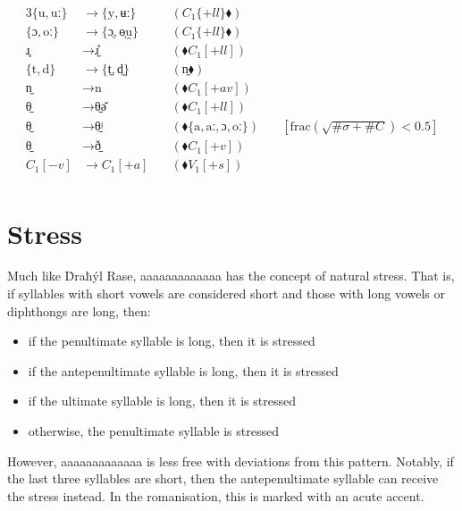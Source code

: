 \documentclass{book}
\newcommand{\lname}{aaaaaaaaaaaaa}
\begin{document}
\begin{alignat*}{3}
  \{\text{u}, \text{uː}\} &\rightarrow \{\text{y}, \text{ʉː}\} &\quad(C_1\{+ll\} \blacklozenge) \\
  \{\text{ɔ}, \text{oː}\} &\rightarrow \{\text{ɔ̜}, \text{ɵ̜u̯}\} &\quad(C_1\{+ll\} \blacklozenge) \\
  \text{ɹ̥} &\rightarrow \text{ɹ̼̊} &\quad(\blacklozenge C_1[+ll]) \\
  \{\text{t}, \text{d}\} &\rightarrow \{\text{t̼}, \text{d̼}\} &\quad(\text{n̼} \blacklozenge) \\
  \text{n̼} &\rightarrow \text{n} &\quad(\blacklozenge C_1[+av]) \\
  \text{θ̠} &\rightarrow \text{θ̠ə̆} &\quad(\blacklozenge C_1[+ll]) \\
  \text{θ̠} &\rightarrow \text{θ̠ʲ} &\quad(\blacklozenge \{\text{a}, \text{aː}, \text{ɔ}, \text{oː}\})
    &\quad\left[\text{frac}\left(\sqrt{\#\sigma + \#C}\right) < 0.5\right] \\
  \text{θ̠} &\rightarrow \text{ð̠} &\quad(\blacklozenge C_1[+v]) \\
  C_1[-v] &\rightarrow C_1[+a] &\quad(\blacklozenge V_1[+s]) \\
\end{alignat*}

\section{Stress}

Much like Ḋraħýl Rase, \lname{} has the concept of natural stress. That is, if syllables with short vowels are considered short and those with long vowels or diphthongs are long, then:

\begin{itemize}
  \item if the penultimate syllable is long, then it is stressed
  \item if the antepenultimate syllable is long, then it is stressed
  \item if the ultimate syllable is long, then it is stressed
  \item otherwise, the penultimate syllable is stressed
\end{itemize}

However, \lname{} is less free with deviations from this pattern. Notably, if the last three syllables are short, then the antepenultimate syllable can receive the stress instead. In the romanisation, this is marked with an acute accent.
\end{document}
